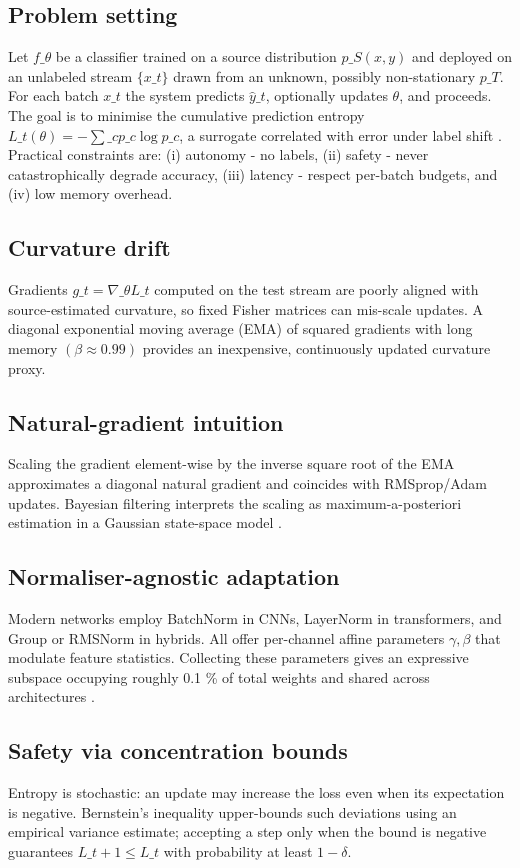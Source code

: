 \documentclass{article} %
\begin{document}
\subsection{Problem setting}
Let \(f\_\theta\) be a classifier trained on a source distribution \(p\_S(x,y)\) and deployed on an unlabeled stream \(\{x\_t\}\) drawn from an unknown, possibly non-stationary \(p\_T\). For each batch \(x\_t\) the system predicts \(\hat{y}\_t\), optionally updates \(\theta\), and proceeds. The goal is to minimise the cumulative prediction entropy \(L\_t(\theta) = -\sum\_c p\_c \log p\_c\), a surrogate correlated with error under label shift \cite{wang-2020-tent}. Practical constraints are: (i) autonomy - no labels, (ii) safety - never catastrophically degrade accuracy, (iii) latency - respect per-batch budgets, and (iv) low memory overhead.
\subsection{Curvature drift}
Gradients \(g\_t = \nabla\_\theta L\_t\) computed on the test stream are poorly aligned with source-estimated curvature, so fixed Fisher matrices can mis-scale updates. A diagonal exponential moving average (EMA) of squared gradients with long memory \((\beta \approx 0.99)\) provides an inexpensive, continuously updated curvature proxy.
\subsection{Natural-gradient intuition}
Scaling the gradient element-wise by the inverse square root of the EMA approximates a diagonal natural gradient and coincides with RMSprop/Adam updates. Bayesian filtering interprets the scaling as maximum-a-posteriori estimation in a Gaussian state-space model \cite{aitchison-2018-bayesian}.
\subsection{Normaliser-agnostic adaptation}
Modern networks employ BatchNorm in CNNs, LayerNorm in transformers, and Group or RMSNorm in hybrids. All offer per-channel affine parameters \(\gamma, \beta\) that modulate feature statistics. Collecting these parameters gives an expressive subspace occupying roughly 0.1 \% of total weights and shared across architectures \cite{lim-2023-ttn}.
\subsection{Safety via concentration bounds}
Entropy is stochastic: an update may increase the loss even when its expectation is negative. Bernstein's inequality upper-bounds such deviations using an empirical variance estimate; accepting a step only when the bound is negative guarantees \(L\_{t+1} \leq L\_t\) with probability at least \(1-\delta\).
\end{document}
